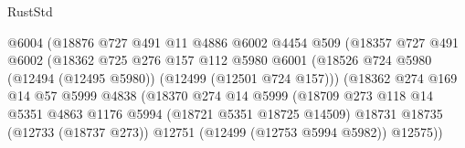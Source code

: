 \begin{lexlean}{RustStd}
\begin{coremodule}
                                    @6004
                                    (@18876
                                      @727
                                      @491
                                      @11
                                      @4886
                                      @6002
                                      @4454
                                      @509
                                      (@18357
                                        @727
                                        @491
                                        @6002
                                        (@18362
                                          @725
                                          @276
                                          @157
                                          @112
                                          @5980
                                          @6001
                                          (@18526
                                            @724
                                            @5980
                                            (@12494 (@12495 @5980))
                                            (@12499 (@12501 @724 @157)))
                                          (@18362
                                            @274
                                            @169
                                            @14
                                            @57
                                            @5999
                                            @4838
                                            (@18370
                                              @274
                                              @14
                                              @5999
                                              (@18709
                                                @273
                                                @118
                                                @14
                                                @5351
                                                @4863
                                                @1176
                                                @5994
                                                (@18721 @5351 @18725 @14509)
                                                @18731
                                                @18735
                                                (@12733 (@18737 @273))
                                                @12751
                                                (@12499 (@12753 @5994 @5982))
                                                @12575))

\end{coremodule}
\end{lexlean}
